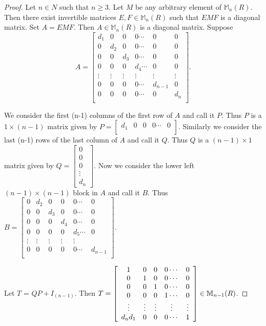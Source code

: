 \documentclass{amsart}
\begin{document}
\begin{proof}
Let $n \in N$ such that $n \ge 3$. Let $M$ be any arbitrary element of $\mathbb M_n(R)$. Then there exist invertible matrices $E, F\in \mathbb M_n(R)$ such that $EMF$ is a diagonal matrix. Set $A=EMF$. Then $A\in \mathbb M_n(R)$ is a diagonal matrix. Suppose \[A=  \left[\begin{array}{ccccccc}
d_{1}&0&0&0\cdots&0&0  \\0&d_{2}&0&0\cdots&0&0\\  0&0&d_{3}&0\cdots&0&0 \\ 0&0&0&d_{4}\cdots&0&0 \\   \vdots  &\vdots   &\vdots &\vdots  &\vdots &\vdots  \\ 0&0&0&0\cdots&d_{n-1}&0\\0&0&0&0\cdots&0&d_{n}\\ \end{array}\right].\]

\noindent We consider the first (n-1) columns of the first row of $A$ and call it $P$. Thus $P$ is a $1\times (n-1)$ matrix given by $P=\left[\begin{array}{ccccccc}
d_{1}&0&0&0\cdots&0 \\ \end{array}\right]$. 
Similarly we consider the last (n-1) rows of the last column of $A$ and call it $Q$. Thus $Q$ is a $(n-1) \times 1$ matrix given by $Q=\left[\begin{array}{c}
0 \\ 0\\0\\ \vdots\\d_{n} \end{array}\right]$. Now we consider the lower left $(n-1)\times (n-1)$ block in $A$ and call it $B$. Thus $B=\left[\begin{array}{cccccc}
0&d_{2}&0&0&0\cdots&0  \\0&0&d_{3}&0&0\cdots&0\\  0&0&0&d_{4}&0\cdots&0 \\ 0&0&0&0&d_{5}\cdots&0 \\   \vdots  &\vdots   &\vdots &\vdots   &\vdots  \\ 0&0&0&0&0\cdots&d_{n-1}\\ \end{array}\right].
$

\noindent Let $T$ = $QP + I_{(n-1)}$. Then $T=\left[\begin{array}{ccccc}
1&0&0&0\cdots&0 \\0&1&0&0\cdots&0\\  0&0&1&0\cdots&0 \\ 0&0&0&1\cdots&0 \\   \vdots  &\vdots   &\vdots &\vdots   &\vdots  \\ d_n\*d_1&0&0&0\cdots&1\\ \end{array}\right] \in \mathbb M_{n-1}(R)$.


\end{proof}
\end{document}
